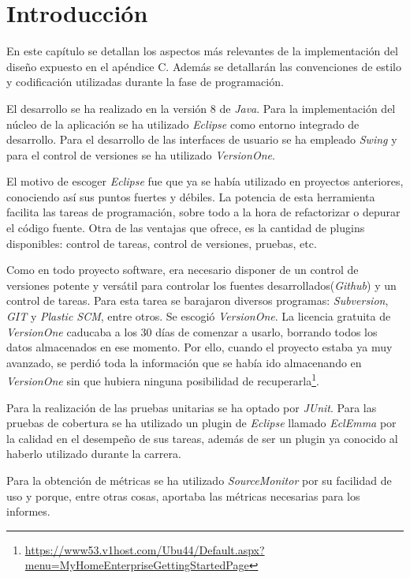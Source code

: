 
\section{Introducción}
En este capítulo se detallan los aspectos más relevantes de la implementación del diseño expuesto en el apéndice C. Además se detallarán las convenciones de estilo y codificación utilizadas durante la fase de programación.

El desarrollo se ha realizado en la versión 8 de \textit{Java}. Para la implementación del núcleo de la aplicación se ha utilizado \textit{Eclipse} como entorno integrado de desarrollo. Para el desarrollo de
las interfaces de usuario se ha empleado \textit{Swing} y para el control de versiones se ha utilizado \textit{VersionOne}.

El motivo de escoger \textit{Eclipse} fue que ya se había utilizado en proyectos anteriores, conociendo así sus puntos fuertes y débiles. La potencia de esta herramienta facilita las tareas de programación, sobre todo a la hora de refactorizar o depurar el código fuente. Otra de las ventajas que ofrece, es la cantidad de plugins disponibles: control de tareas, control de versiones, pruebas, etc.

Como en todo proyecto software, era necesario disponer de un control de versiones potente y versátil para controlar los fuentes desarrollados(\textit{Github}) y un control de tareas. Para esta tarea se barajaron diversos programas: \textit{Subversion}, \textit{GIT} y \textit{Plastic SCM}, entre otros. Se escogió \textit{VersionOne}. La licencia gratuita de \textit{VersionOne} caducaba a los 30 días de comenzar a usarlo, borrando todos los datos almacenados en ese momento. Por ello, cuando el proyecto estaba ya muy avanzado, se perdió toda la información que se había ido almacenando en \textit{VersionOne} sin que hubiera ninguna posibilidad de recuperarla\footnote{\url {https://www53.v1host.com/Ubu44/Default.aspx?menu=MyHomeEnterpriseGettingStartedPage}}.

Para la realización de las pruebas unitarias se ha optado por \textit{JUnit}. Para las pruebas de cobertura se ha utilizado un plugin de \textit{Eclipse} llamado \textit{EclEmma} por la calidad en el desempeño de sus tareas, además de ser un plugin ya conocido al haberlo utilizado durante la carrera.

Para la obtención de métricas se ha utilizado \textit{SourceMonitor} por su facilidad de
uso y porque, entre otras cosas, aportaba las métricas necesarias para los informes.

